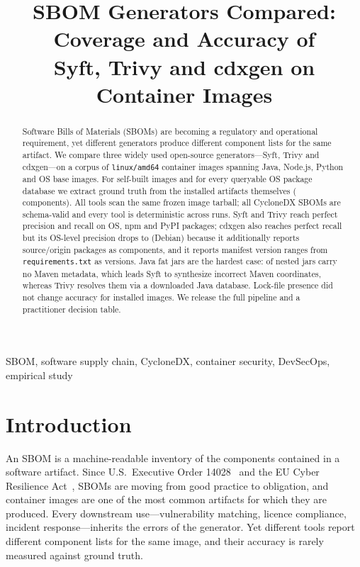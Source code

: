\documentclass[conference]{IEEEtran}
\newcommand{\syft}{Syft\xspace}
\newcommand{\trivy}{Trivy\xspace}
\newcommand{\cdxgen}{cdxgen\xspace}
\begin{document}
\title{SBOM Generators Compared: Coverage and Accuracy of\\Syft, Trivy and cdxgen on Container Images}
\author{
}
\maketitle

\begin{abstract}
Software Bills of Materials (SBOMs) are becoming a regulatory and operational requirement, yet
different generators produce different component lists for the same artifact. We compare three widely
used open-source generators---\syft, \trivy and \cdxgen---on a corpus of \NImages{} \texttt{linux/amd64}
container images spanning Java, Node.js, Python and OS base images. For \NSelfBuilt{} self-built images
and for every queryable OS package database we extract ground truth from the installed artifacts
themselves (\NGTComponents{} components). All tools scan the same frozen image tarball; all
\NSboms{} CycloneDX SBOMs are schema-valid and every tool is deterministic across \NDetRuns{} runs.
\syft and \trivy reach perfect precision and recall on OS, npm and PyPI packages; \cdxgen also reaches
perfect recall but its OS-level precision drops to \PCdxgenDeb{} (Debian) because it additionally reports
source/origin packages as components, and it reports manifest version ranges from
\texttt{requirements.txt} as versions. Java fat jars are the hardest case: \NJarsNoMeta{} of
\NNestedJars{} nested jars carry no Maven metadata, which leads \syft to synthesize
\FailFThreeSyft{} incorrect Maven coordinates, whereas \trivy resolves them via a downloaded Java
database. Lock-file presence did not change accuracy for installed images. We release the full pipeline
and a practitioner decision table.
\end{abstract}

\begin{IEEEkeywords}
SBOM, software supply chain, CycloneDX, container security, DevSecOps, empirical study
\end{IEEEkeywords}

\section{Introduction}
An SBOM is a machine-readable inventory of the components contained in a software artifact. Since
U.S.\ Executive Order 14028~\cite{eo14028} and the EU Cyber Resilience Act~\cite{eucra}, SBOMs are moving
from good practice to obligation, and container images are one of the most common artifacts for which
they are produced. Every downstream use---vulnerability matching, licence compliance, incident
response---inherits the errors of the generator. Yet different tools report different component lists
for the same image, and their accuracy is rarely measured against ground truth.
\end{document}
